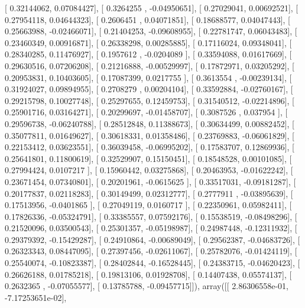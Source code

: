 \documentclass{article}
\begin{document}
       [ 0.32144062,  0.07084427],
       [ 0.3264255 , -0.04950651],
       [ 0.27029041,  0.00692521],
       [ 0.27954118,  0.04644323],
       [ 0.2606451 ,  0.04071851],
       [ 0.18688577,  0.04047443],
       [ 0.25663988, -0.02466071],
       [ 0.21404253, -0.09608955],
       [ 0.22781747,  0.06043483],
       [ 0.23460349,  0.00916871],
       [ 0.26338298,  0.00285885],
       [ 0.17116024,  0.09348041],
       [ 0.28340285,  0.11476927],
       [ 0.1957612 , -0.0204089 ],
       [ 0.33594088,  0.01617669],
       [ 0.29630516,  0.07206208],
       [ 0.21216888, -0.00529997],
       [ 0.17872971,  0.03205292],
       [ 0.20953831,  0.10403605],
       [ 0.17087399,  0.0217755 ],
       [ 0.3613554 , -0.00239134],
       [ 0.31924027,  0.09894955],
       [ 0.2708279 ,  0.00204104],
       [ 0.33592884, -0.02760167],
       [ 0.29215798,  0.10027748],
       [ 0.25297655,  0.12459753],
       [ 0.31540512, -0.02214896],
       [ 0.25901716,  0.03164271],
       [ 0.20299697, -0.01458707],
       [ 0.3087526 ,  0.037954  ],
       [ 0.29596738, -0.06240788],
       [ 0.28512848,  0.11388673],
       [ 0.30634499,  0.00882452],
       [ 0.35077811,  0.01649627],
       [ 0.30618331,  0.01358486],
       [ 0.23769883, -0.06061829],
       [ 0.22153412,  0.03623551],
       [ 0.36039458, -0.06995202],
       [ 0.17583707,  0.12869936],
       [ 0.25641801,  0.11800619],
       [ 0.32529907,  0.15150451],
       [ 0.18548528,  0.00101085],
       [ 0.27994424,  0.0107217 ],
       [ 0.15960442,  0.03275868],
       [ 0.20463953, -0.01622242],
       [ 0.23671454,  0.07340801],
       [ 0.20201961, -0.0615625 ],
       [ 0.33517031, -0.09181287],
       [ 0.20177837,  0.02118283],
       [ 0.30149499,  0.02312777],
       [ 0.2777911 , -0.03895639],
       [ 0.17513956, -0.0401865 ],
       [ 0.27049119,  0.0160717 ],
       [ 0.22350961,  0.05982411],
       [ 0.17826336, -0.05324791],
       [ 0.33385557,  0.07592176],
       [ 0.15538519, -0.08498296],
       [ 0.21520096,  0.03500543],
       [ 0.25301357, -0.05198987],
       [ 0.24987448, -0.12311932],
       [ 0.29379392, -0.15429287],
       [ 0.24910864, -0.00689049],
       [ 0.29562387, -0.04683726],
       [ 0.26323343,  0.08447095],
       [ 0.27397456, -0.02611067],
       [ 0.25782076, -0.01424119],
       [ 0.25540074, -0.10823387],
       [ 0.28402844, -0.16528445],
       [ 0.24383715, -0.04620423],
       [ 0.26626188,  0.01785218],
       [ 0.19813106,  0.01928708],
       [ 0.14407438,  0.05574137],
       [ 0.2632365 , -0.07055577],
       [ 0.13785788, -0.09457715]]), array([[  2.86306558e-01,  -7.17253651e-02],
\end{document}
